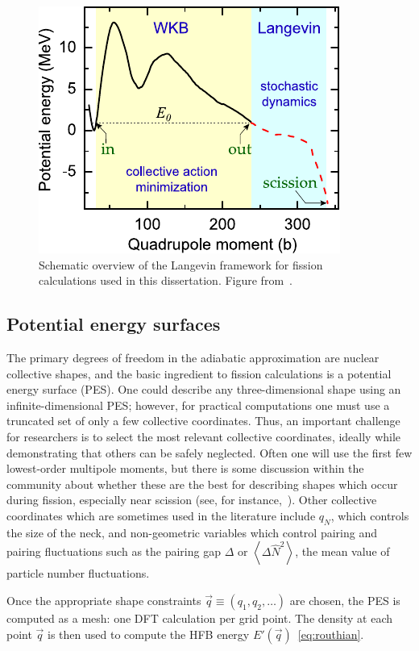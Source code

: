 \begin{figure}
	\centering
	\includegraphics[width=0.5\linewidth]{TeX_files/methods_overview}
	\caption[Schematic overview of the Langevin framework for fission calculations used in this dissertation]{Schematic overview of the Langevin framework for fission calculations used in this dissertation. Figure from~\cite{Sadhukhan2016}.}
	\label{fig:methodsoverview}
\end{figure}

\subsection{Potential energy surfaces}
The primary degrees of freedom in the adiabatic approximation are nuclear collective shapes, and the basic ingredient to fission calculations is a potential energy surface (PES). One could describe any three-dimensional shape using an infinite-dimensional PES; however, for practical computations one must use a truncated set of only a few collective coordinates. Thus, an important challenge for researchers is to select the most relevant collective coordinates, ideally while demonstrating that others can be safely neglected. Often one will use the first few lowest-order multipole moments, but there is some discussion within the community about whether these are the best for describing shapes which occur during fission, especially near scission (see, for instance,~\cite{younes2012}). Other collective coordinates which are sometimes used in the literature include $q_N$, which controls the size of the neck, and non-geometric variables which control pairing and pairing fluctuations such as the pairing gap $\Delta$ or $\left\langle \Delta \hat{N}^2 \right\rangle$, the mean value of particle number fluctuations.

Once the appropriate shape constraints $\vec{q}\equiv(q_1, q_2, \dots)$ are chosen, the PES is computed as a mesh: one DFT calculation per grid point. The density at each point $\vec{q}$ is then used to compute the HFB energy $E'(\vec{q})$~\eqref{eq:routhian}.

